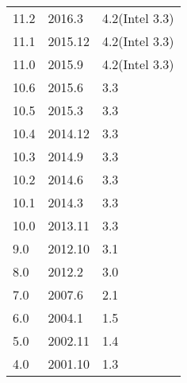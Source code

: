\begin{center}  
\tablelasttail{\bottomrule}

\begin{supertabular}{p{2.cm}p{2.cm}m{11.cm}}
      11.2 & 2016.3 & 4.2(Intel 3.3)\\
      11.1 & 2015.12 & 4.2(Intel 3.3)\\
      11.0 & 2015.9 & 4.2(Intel 3.3)\\
      10.6 & 2015.6 & 3.3\\
      10.5 & 2015.3 & 3.3\\
      10.4 & 2014.12 & 3.3\\
      10.3 & 2014.9 & 3.3\\
      10.2 & 2014.6 & 3.3\\
      10.1 & 2014.3 & 3.3\\
      10.0 & 2013.11 & 3.3\\
      9.0 & 2012.10 & 3.1\\
      8.0 & 2012.2 & 3.0\\
      7.0 & 2007.6 & 2.1\\
      6.0 & 2004.1 & 1.5\\
      5.0 & 2002.11 & 1.4\\
      4.0 & 2001.10 & 1.3\\
\end{supertabular}
\end{center}
